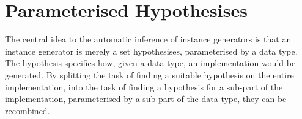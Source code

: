 \documentclass{llncs}
\begin{document}
\begin{comment}
To write an instance generator for DrIFT requires the implementation of a function, which takes a representation of a data type, and generates Haskell code. The code must be generated using special functions to ensure it has the correct layout. The author of an instance generator must be familiar with both the representation of the data structure, and with the code-generation functions.

\subsection{The Derive tool}

The Derive tool \cite{derive} is a competitor to DrIFT, designed to alleviate some of the disadvantages. The first advantage is that instance generators can added easily, without modifying the Derive tool. Secondly, by using the Template Haskell \cite{template_haskell} extension, no preprocessing phase is required. In order to integrate with Template Haskell, an instance generator takes a representation of a data type, and generates a Haskell syntax tree.

Writing an instance generator requires knowledge of the representation of both the data type, and the Haskell syntax tree. Unfortunately, the Haskell syntax tree is represented by a large data type, which takes time to learn. After writing an instance generator, the user must check that the generator matches their intention, by testing on a suitable range of data types. Both of these factors increase the time required to write an instance generator.

We have integrated automatic derivation of an instance generator, following the scheme in this paper, into the Derive tool. In order to specify a new instance generator, the user can \textit{either} specify a derivation function, \textit{or} have one automatically generated from an example.
\end{comment}

\section{Parameterised Hypothesises}

The central idea to the automatic inference of instance generators is that an instance generator is merely a set hypothesises, parameterised by a data type. The hypothesis specifies how, given a data type, an implementation would be generated. By splitting the task of finding a suitable hypothesis on the entire implementation, into the task of finding a hypothesis for a sub-part of the implementation, parameterised by a sub-part of the data type, they can be recombined.
\end{document}

